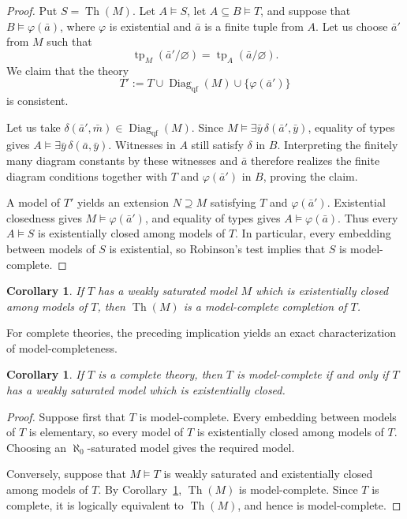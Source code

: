 \documentclass[10pt,a4paper]{amsart}
\newtheorem{corollary}[theorem]{Corollary}
\theoremstyle{definition}
\DeclareMathOperator{\Th}{Th}
\begin{document}
\begin{proof}
Put $S=\Th(M)$. Let $A\models S$, let $A\subseteq B\models T$,
and suppose that $B\models\varphi(\bar a)$, where $\varphi$ is
existential and $\bar a$ is a finite tuple from $A$. Let us choose
$\bar a'$ from $M$ such that
\[
  \operatorname{tp}_M(\bar a'/\varnothing)
  =\operatorname{tp}_A(\bar a/\varnothing).
\]
We claim that the theory
\[
T':= T\cup\operatorname{Diag}_{\mathrm{qf}}(M)\cup\{\varphi(\bar a')\}
\]
is consistent.

Let us take 
$\delta(\bar a',\bar m)\in \operatorname{Diag}_{\mathrm{qf}}(M)$. Since
$M\models\exists\bar y\,\delta(\bar a',\bar y)$, equality of
types gives $A\models\exists\bar y\,\delta(\bar a,\bar y)$.
Witnesses in $A$ still satisfy $\delta$ in $B$. Interpreting the
finitely many diagram constants by these witnesses and $\bar a$
therefore realizes the finite diagram conditions together with
$T$ and $\varphi(\bar a')$ in $B$, proving the claim.

A model of $T'$ yields an extension $N\supseteq M$ satisfying
$T$ and $\varphi(\bar a')$. Existential closedness gives
$M\models\varphi(\bar a')$, and equality of types gives
$A\models\varphi(\bar a)$. Thus every $A\models S$ is
existentially closed among models of $T$. In particular, every
embedding between models of $S$ is existential, so Robinson's
test implies that $S$ is model-complete.
\end{proof}

\begin{corollary}\label{mc:cor:saturated-completion}
If $T$ has a weakly saturated model $M$ which is
existentially closed among models of $T$, then $\Th(M)$ is a
model-complete completion of $T$.
\end{corollary}

For complete theories, the preceding implication yields an exact
characterization of model-completeness.

\begin{corollary}\label{mc:cor:complete-case}
If $T$ is a complete theory, then $T$ is model-complete if and only if $T$ has a
weakly saturated model which is existentially closed.
\end{corollary}

\begin{proof}
Suppose first that $T$ is model-complete. Every embedding between
models of $T$ is elementary, so every model of $T$ is existentially
closed among models of $T$. Choosing an $\aleph_0$-saturated
model gives the required model.

Conversely, suppose that $M\models T$ is weakly saturated 
and existentially closed among models of $T$.
By Corollary~\ref{mc:cor:saturated-completion}, $\Th(M)$ is
model-complete. Since $T$ is complete, it is logically equivalent
to $\Th(M)$, and hence is model-complete.
\end{proof}
\end{document}
